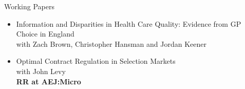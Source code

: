 \documentclass{resume}
\begin{document}
\begin{rSection}{Working Papers}

\begin{itemize}
	\item Information and Disparities in Health Care Quality: Evidence from GP Choice in England \\ 
	with Zach Brown, Christopher Hansman and Jordan Keener 
	
\item Optimal Contract Regulation in Selection Markets \\
with John Levy \\
	\textbf{RR at AEJ:Micro}


\end{itemize}




\end{rSection}
\end{document}
